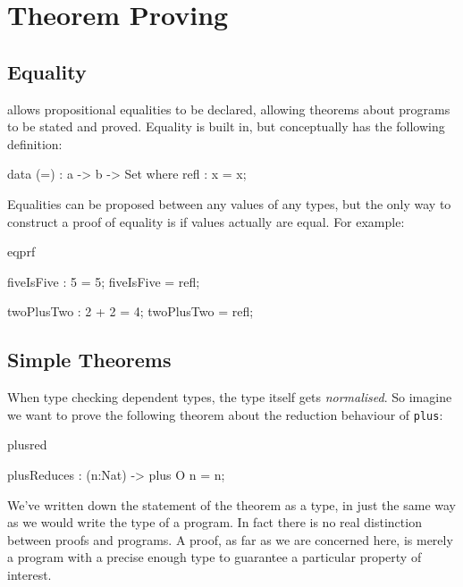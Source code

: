 \section{Theorem Proving}

\subsection{Equality}

\Idris{} allows propositional equalities to be declared, allowing theorems about
programs to be stated and proved. Equality is built in, but conceptually has
the following definition:

\begin{SaveVerbatim}{}

data (=) : a -> b -> Set where
   refl : x = x;

\end{SaveVerbatim}
\useverb{}

\noindent
Equalities can be proposed between any values of any types, but the only way to
construct a proof of equality is if values actually are equal. For example:

\begin{SaveVerbatim}{eqprf}

fiveIsFive : 5 = 5;
fiveIsFive = refl;

twoPlusTwo : 2 + 2 = 4;
twoPlusTwo = refl;

\end{SaveVerbatim}

\subsection{Simple Theorems}

When type checking dependent types, the type itself gets \emph{normalised}. So imagine
we want to prove the following theorem about the reduction behaviour of \texttt{plus}:

\begin{SaveVerbatim}{plusred}

plusReduces : (n:Nat) -> plus O n = n;

\end{SaveVerbatim}

\noindent
We've written down the statement of the theorem as a type, in just the same way
as we would write the type of a program. In fact there is no real distinction
between proofs and programs. A proof, as far as we are concerned here, is
merely a program with a precise enough type to guarantee a particular property
of interest.

